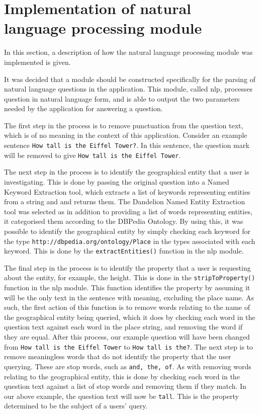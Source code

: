 \documentclass[authoryearcitations]{UoYCSproject}
\begin{document}
\section{Implementation of natural language processing module}
In this section, a description of how the natural language processing module was implemented is given.

It was decided that a module should be constructed specifically for the parsing of natural language questions in the application.  This module, called nlp, processes question in natural language form, and is able to output the two parameters needed by the application for answering a question.

The first step in the process is to remove punctuation from the question text, which is of no meaning in the context of this application. Consider an example sentence \texttt{How tall is the Eiffel Tower?}. In this sentence, the question mark will be removed to give \texttt{How tall is the Eiffel Tower}.

\begin{sloppypar} %
The next step in the process is to identify the geographical entity that a user is investigating. This is done by passing the original question into a Named Keyword Extraction tool, which extracts a list of keywords representing entities from a string and and returns them. The Dandelion Named Entity Extraction tool was selected as in addition to providing a list of words representing entities, it categorised them according to the DBPedia Ontology. By using this, it was possible to identify the geographical entity by simply checking each keyword for the type \texttt{http://dbpedia.org/ontology/Place} in the types associated with each keyword.  This is done by the \texttt{extractEntities()} function in the nlp module.
\end{sloppypar}

The final step in the process is to identify the property that a user is requesting about the entity, for example, the height. This is done in the \texttt{stripToProperty()} function in the nlp module. This function identifies the property by assuming it will be the only text in the sentence with meaning, excluding the place name. As such, the first action of this function is to remove words relating to the name of the geographical entity being queried, which it does by checking each word in the question text against each word in the place string, and removing the word if they are equal. After this process, our example question will have been changed from \texttt{How tall is the Eiffel Tower} to \texttt{How tall is the?}. The next step is to remove meaningless words that do not identify the property that the user querying. These are stop words, such as \texttt{and, the, of}. As with removing words relating to the geographical entity, this is done by checking each word in the question text against a list of stop words and removing them if they match. In our above example, the question text will now be \texttt{tall}. This is the property determined to be the subject of a users' query.
\end{document}
